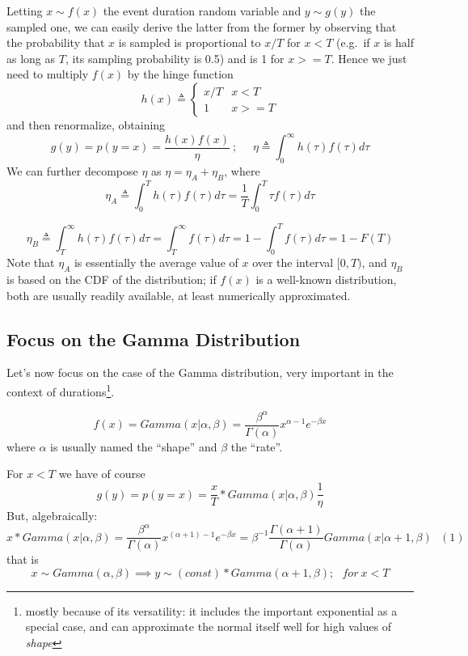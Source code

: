 \documentclass[]{article}
\begin{document}
Letting \(x \sim f(x)\) the event duration random variable and
\(y \sim g(y)\) the sampled one, we can easily derive the latter from
the former by observing that the probability that \(x\) is sampled is
proportional to \(x/T\) for \(x<T\) (e.g.~if \(x\) is half as long as
\(T\), its sampling probability is 0.5) and is 1 for \(x>=T\). Hence we
just need to multiply \(f(x)\) by the hinge function \[ h(x) \triangleq
    \begin{cases}
      x/T & x < T \\
      1 & x >= T
    \end{cases}
\] and then renormalize, obtaining \[
g(y) = p(y=x) =  \frac{h(x)f(x)}{\eta}\ ;\ \ \ \ \ \  \eta \triangleq \int_{0}^{\infty} h(\tau)f(\tau) d\tau
\] We can further decompose \(\eta\) as \(\eta = \eta_A + \eta_B\),
where \[
 \eta_A \triangleq \int_{0}^{T} h(\tau)f(\tau) d\tau = \frac{1}{T} \int_{0}^{T} \tau f(\tau) d\tau
 \]

\[\eta_B \triangleq \int_{T}^{\infty} h(\tau)f(\tau) d\tau = \int_{T}^{\infty} f(\tau) d\tau = 1 - \int_{0}^{T} f(\tau) d\tau = 1 - F(T)
\] Note that \(\eta_A\) is essentially the average value of \(x\) over
the interval \([0,T)\), and \(\eta_B\) is based on the CDF of the
distribution; if \(f(x)\) is a well-known distribution, both are usually
readily available, at least numerically approximated.

\hypertarget{focus-on-the-gamma-distribution}{%
\subsection{Focus on the Gamma
Distribution}\label{focus-on-the-gamma-distribution}}

Let's now focus on the case of the Gamma distribution, very important in
the context of durations\footnote{mostly because of its versatility: it
  includes the important exponential as a special case, and can
  approximate the normal itself well for high values of \emph{shape}}.

\[
  f(x) = Gamma(x | \alpha,\beta) = \frac{\beta^\alpha}{\Gamma(\alpha)} x^{\alpha-1}e^{-\beta x} 
\] where \(\alpha\) is usually named the ``shape'' and \(\beta\) the
``rate''.

For \(x<T\) we have of course \[
  g(y) = p(y=x) = \frac{x}{T} * Gamma(x | \alpha,\beta) \frac{1}{\eta}
\] But, algebraically: \[
  x * Gamma(x | \alpha,\beta) = 
  \frac{\beta^\alpha}{\Gamma(\alpha)} x^{(\alpha+1)-1}e^{-\beta x} = 
  \beta^{-1} \frac{\Gamma(\alpha+1)}{\Gamma(\alpha)}Gamma(x|\alpha+1,\beta) \ \ \ (1)
\] that is \[
 x \sim Gamma(\alpha, \beta)   \implies y \sim (const) * Gamma(\alpha+1, \beta); \ \ \ for \ x < T 
\]
\end{document}

